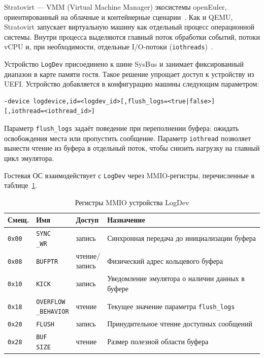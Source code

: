 Stratovirt --- VMM (Virtual Machine Manager) экосистемы openEuler,
ориентированный на облачные и контейнерные сценарии~\cite{stratovirt_openeuler}.
Как и QEMU, Stratovirt запускает виртуальную машину как отдельный процесс
операционной системы. Внутри процесса выделяются главный поток обработки
событий, потоки vCPU и, при необходимости, отдельные I/O-потоки
(\texttt{iothreads})~\cite{stratovirt_design}.

Устройство \texttt{LogDev} присоединено к шине SysBus и занимает фиксированный
диапазон в карте памяти гостя. Такое решение упрощает доступ к устройству из
UEFI. Устройство добавляется в конфигурацию машины следующим параметром:

\begin{lstlisting}
-device logdevice,id=<logdev_id>[,flush_logs=<true|false>]
[,iothread=<iothread_id>]
\end{lstlisting}

Параметр \texttt{flush\_logs} задаёт поведение при переполнении буфера: ожидать
освобождения места или пропустить сообщение. Параметр \texttt{iothread} позволяет
вынести чтение из буфера в отдельный поток, чтобы снизить нагрузку на главный
цикл эмулятора.

Гостевая ОС взаимодействует с \texttt{LogDev} через MMIO-регистры, перечисленные
в таблице~\ref{tab:logdev-regs}.

\begin{table}[H]
    \centering
    \caption{Регистры MMIO устройства LogDev}
    \label{tab:logdev-regs}
    \begin{tabularx}{\textwidth}{|p{1.2cm}|p{2.0cm}|p{1.6cm}|>{\raggedright\arraybackslash}X|}
        \hline
        Смещ. & Имя & Доступ & Назначение \\
        \hline
        \texttt{0x00} & \makecell[l]{\texttt{SYNC}\\\texttt{\_WR}} & запись &
        Синхронная передача до инициализации буфера \\
        \texttt{0x08} & \texttt{BUFPTR} & \makecell[l]{чтение/\\запись} &
        Физический адрес кольцевого буфера \\
        \texttt{0x10} & \texttt{KICK} & запись &
        Уведомление эмулятора о наличии данных в буфере \\
        \texttt{0x18} & \makecell[l]{\texttt{OVERFLOW}\\\texttt{\_BEHAVIOR}} & чтение &
        Текущее значение параметра \texttt{flush\_logs} \\
        \texttt{0x20} & \texttt{FLUSH} & запись &
        Принудительное чтение доступных сообщений \\
        \texttt{0x28} & \makecell[l]{\texttt{BUF}\\\texttt{SIZE}} & чтение &
        Размер полезной области буфера \\
        \hline
    \end{tabularx}
\end{table}

